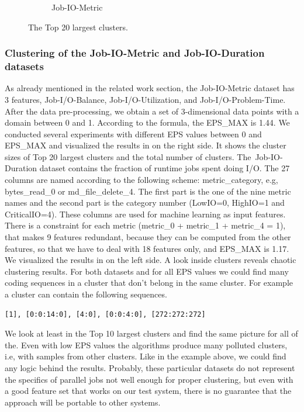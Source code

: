 \documentclass[]{llncs}
\begin{document}
\begin{figure}
\begin{subfigure}[t]{0.45\textwidth}
	\caption{Job-IO-Metric}
	\label{fig:datasets_clustering_results:io_metric}
 \end{subfigure}
 \caption{The Top 20 largest clusters.}
 \label{fig:datasets_clustering_results}
\end{figure}
\subsubsection{Clustering of the Job-IO-Metric and Job-IO-Duration datasets}
As already mentioned in the related work section, the Job-IO-Metric dataset has 3 features, Job-I/O-Balance, Job-I/O-Utilization, and Job-I/O-Problem-Time.
After the data pre-processing, we obtain a set of 3-dimensional data points with a domain between 0 and 1.
According to the formula, the EPS\_MAX is 1.44.
We conducted several experiments with different EPS values between 0 and EPS\_MAX and visualized the results in  on the right side.
It shows the cluster sizes of Top 20 largest clusters and the total number of clusters.
The\ Job-IO-Duration dataset contains the fraction of runtime jobs spent doing I/O.
The 27 columns are named according to the following scheme: metric\_category, e.g, bytes\_read\_0 or md\_file\_delete\_4.
The first part is the one of the nine metric names and the second part is the category number (LowIO=0, HighIO=1 and CriticalIO=4).
These columns are used for machine learning as input features.
There is a constraint for each metric (metric\_0 + metric\_1 + metric\_4 = 1), that makes 9 features redundant, because they can be computed from the other features, so that we have to deal with 18 features only, and EPS\_MAX is 1.17.
We visualized the results in  on the left side.
A look inside clusters reveals chaotic clustering results.
For both datasets and for all EPS values we could find many coding sequences in a cluster that don't belong in the same cluster.
For example a cluster can contain the following sequences.

\begin{lstlisting}
[1], [0:0:14:0], [4:0], [0:0:4:0], [272:272:272] 
\end{lstlisting}

We look at least in the Top 10 largest clusters and find the same picture for all of the.
Even with low EPS values the algorithms produce many polluted clusters, i.e, with samples from other clusters.
Like in the example above, we could find any logic behind the results.
Probably, these particular datasets do not represent the specifics of parallel jobs not well enough for proper clustering, but even with a good feature set that works on our test system, there is no guarantee that the approach will be portable to other systems.
\end{document}
